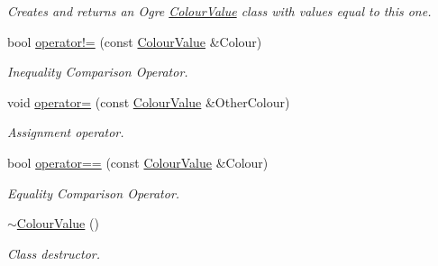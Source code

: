 \begin{DoxyCompactItemize}
\begin{DoxyCompactList}\small\item\em Creates and returns an Ogre \hyperlink{classphys_1_1ColourValue}{ColourValue} class with values equal to this one. \item\end{DoxyCompactList}\item 
bool \hyperlink{classphys_1_1ColourValue_a06b52ce51b723ea733f2b067b03530a5}{operator!=} (const \hyperlink{classphys_1_1ColourValue}{ColourValue} \&Colour)
\begin{DoxyCompactList}\small\item\em Inequality Comparison Operator. \item\end{DoxyCompactList}\item 
void \hyperlink{classphys_1_1ColourValue_af6df730e4a222be3caeca83db91a56ec}{operator=} (const \hyperlink{classphys_1_1ColourValue}{ColourValue} \&OtherColour)
\begin{DoxyCompactList}\small\item\em Assignment operator. \item\end{DoxyCompactList}\item 
bool \hyperlink{classphys_1_1ColourValue_a4615835cadb51c814ef87377ac2fbc8c}{operator==} (const \hyperlink{classphys_1_1ColourValue}{ColourValue} \&Colour)
\begin{DoxyCompactList}\small\item\em Equality Comparison Operator. \item\end{DoxyCompactList}\item 
\hypertarget{classphys_1_1ColourValue_adc37cfdba61d80ad23765cea5c858751}{
\hyperlink{classphys_1_1ColourValue_adc37cfdba61d80ad23765cea5c858751}{$\sim$ColourValue} ()}
\label{classphys_1_1ColourValue_adc37cfdba61d80ad23765cea5c858751}

\begin{DoxyCompactList}\small\item\em Class destructor. \item\end{DoxyCompactList}\end{DoxyCompactItemize}
